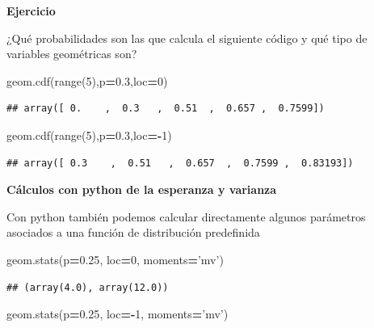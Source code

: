 \documentclass[]{book}
\newenvironment{Shaded}{\begin{snugshade}}{\end{snugshade}}
\newcommand{\BuiltInTok}[1]{#1}
\newcommand{\DecValTok}[1]{\textcolor[rgb]{0.00,0.00,0.81}{#1}}
\newcommand{\FloatTok}[1]{\textcolor[rgb]{0.00,0.00,0.81}{#1}}
\newcommand{\NormalTok}[1]{#1}
\newcommand{\OperatorTok}[1]{\textcolor[rgb]{0.81,0.36,0.00}{\textbf{#1}}}
\newcommand{\StringTok}[1]{\textcolor[rgb]{0.31,0.60,0.02}{#1}}
\begin{document}
\textbf{Ejercicio}

¿Qué probabilidades son las que calcula el siguiente código y qué tipo de variables geométricas son?

\begin{Shaded}
\begin{Highlighting}[]
\NormalTok{geom.cdf(}\BuiltInTok{range}\NormalTok{(}\DecValTok{5}\NormalTok{),p}\OperatorTok{=}\FloatTok{0.3}\NormalTok{,loc}\OperatorTok{=}\DecValTok{0}\NormalTok{)}
\end{Highlighting}
\end{Shaded}

\begin{verbatim}
## array([ 0.    ,  0.3   ,  0.51  ,  0.657 ,  0.7599])
\end{verbatim}

\begin{Shaded}
\begin{Highlighting}[]
\NormalTok{geom.cdf(}\BuiltInTok{range}\NormalTok{(}\DecValTok{5}\NormalTok{),p}\OperatorTok{=}\FloatTok{0.3}\NormalTok{,loc}\OperatorTok{=-}\DecValTok{1}\NormalTok{)}
\end{Highlighting}
\end{Shaded}

\begin{verbatim}
## array([ 0.3    ,  0.51   ,  0.657  ,  0.7599 ,  0.83193])
\end{verbatim}

\textbf{Cálculos con python de la esperanza y varianza}

Con python también podemos calcular directamente algunos parámetros asociados a una función de distribución predefinida

\begin{Shaded}
\begin{Highlighting}[]
\NormalTok{geom.stats(p}\OperatorTok{=}\FloatTok{0.25}\NormalTok{, loc}\OperatorTok{=}\DecValTok{0}\NormalTok{, moments}\OperatorTok{=}\StringTok{'mv'}\NormalTok{)}
\end{Highlighting}
\end{Shaded}

\begin{verbatim}
## (array(4.0), array(12.0))
\end{verbatim}

\begin{Shaded}
\begin{Highlighting}[]
\NormalTok{geom.stats(p}\OperatorTok{=}\FloatTok{0.25}\NormalTok{, loc}\OperatorTok{=-}\DecValTok{1}\NormalTok{, moments}\OperatorTok{=}\StringTok{'mv'}\NormalTok{)}
\end{Highlighting}
\end{Shaded}
\end{document}
